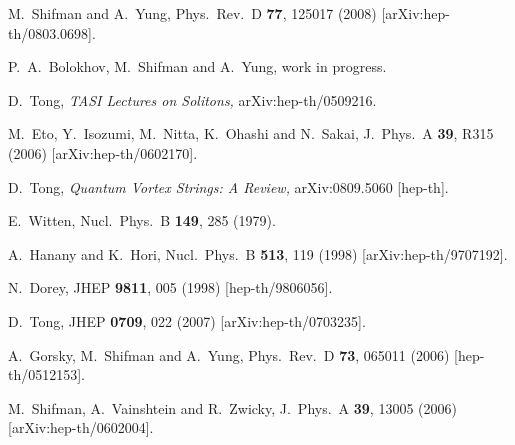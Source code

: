 \documentclass[12pt]{article}
\begin{document}
\begin{thebibliography}{99}
M.~Shifman and A.~Yung,
Phys.\ Rev.\ D {\bf 77}, 125017 (2008)
[arXiv:hep-th/0803.0698].

 P.~A.~Bolokhov, M.~Shifman and A.~Yung,
 work in progress.
  
D.~Tong,
{\em TASI Lectures on Solitons,}
  arXiv:hep-th/0509216.

  M.~Eto, Y.~Isozumi, M.~Nitta, K.~Ohashi and N.~Sakai,
  J.\ Phys.\ A  {\bf 39}, R315 (2006)
  [arXiv:hep-th/0602170].
   
D.~Tong,
{\em Quantum Vortex Strings: A Review,}
  arXiv:0809.5060 [hep-th].
  
E.~Witten,
Nucl.\ Phys.\ B {\bf 149}, 285 (1979).

A.~Hanany and K.~Hori,
  Nucl.\ Phys.\  B {\bf 513}, 119 (1998)
  [arXiv:hep-th/9707192].
  
N.~Dorey,
JHEP {\bf 9811}, 005 (1998) [hep-th/9806056].

  D.~Tong,
  JHEP {\bf 0709}, 022 (2007)
  [arXiv:hep-th/0703235].
  
A.~Gorsky, M.~Shifman and A.~Yung,
 Phys.\ Rev.\  D {\bf 73}, 065011 (2006)
  [hep-th/0512153].

M.~Shifman, A.~Vainshtein and R.~Zwicky,
  J.\ Phys.\ A  {\bf 39}, 13005 (2006)
  [arXiv:hep-th/0602004].

\end{thebibliography}
\end{document}
